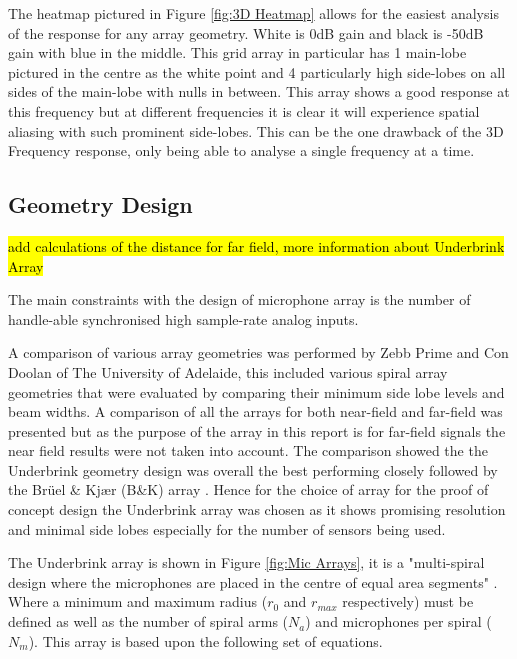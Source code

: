 \documentclass{UoNMCHA}
\numberwithin{equation}{section}
\begin{document}
    The heatmap pictured in Figure \ref{fig:3D Heatmap} allows for the easiest analysis of the response for any array geometry. White is 0dB gain and black is -50dB gain with blue in the middle. This grid array in particular has 1 main-lobe pictured in the centre as the white point and 4 particularly high side-lobes on all sides of the main-lobe with nulls in between. This array shows a good response at this frequency but at different frequencies it is clear it will experience spatial aliasing with such prominent side-lobes. This can be the one drawback of the 3D Frequency response, only being able to analyse a single frequency at a time.

\subsection{Geometry Design} \label{sec:Array Geometry}
    \hl{add calculations of the distance for far field, more information about Underbrink Array}

    The main constraints with the design of microphone array is the number of handle-able synchronised high sample-rate analog inputs.
    
    A comparison of various array geometries was performed by Zebb Prime and Con Doolan of The University of Adelaide, this included various spiral array geometries that were evaluated by comparing their minimum side lobe levels and beam widths. A comparison of all the arrays for both near-field and far-field was presented but as the purpose of the array in this report is for far-field signals the near field results were not taken into account. The comparison showed the the Underbrink geometry design was overall the best performing closely followed by the Brüel \& Kjær (B\&K) array \citep{Pri13}. Hence for the choice of array for the proof of concept design the Underbrink array was chosen as it shows promising resolution and minimal side lobes especially for the number of sensors being used.
    
    The Underbrink array is shown in Figure \ref{fig:Mic Arrays}, it is a "multi-spiral design where the microphones are placed in the centre of equal area segments" \citep{Pri13}. Where a minimum and maximum radius ($r_0$ and $r_{max}$ respectively) must be defined as well as the number of spiral arms ($N_a$) and microphones per spiral ($N_m$). This array is based upon the following set of equations.
    
\end{document}
